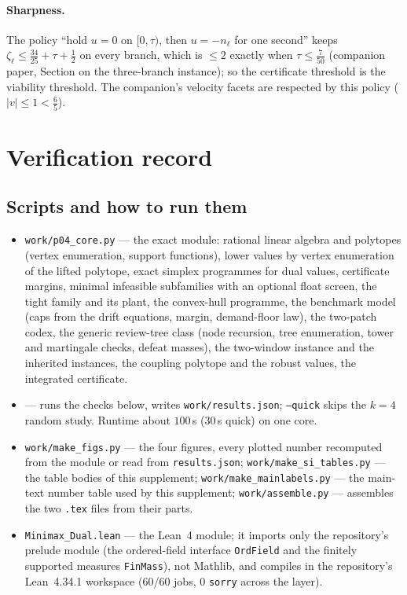 \documentclass[11pt,a4paper]{article}
\theoremstyle{plain}
\theoremstyle{definition}
\theoremstyle{remark}
\newcommand{\tfr}[2]{\tfrac{#1}{#2}}
\begin{document}
\paragraph{Sharpness.} The policy ``hold $u=0$ on $[0,\tau)$, then $u=-n_\ell$ for one second'' keeps $\zeta_\ell\le\tfr{34}{25}+\tau+\tfr12$ on every branch, which is $\le2$ exactly when $\tau\le\tfr7{50}$ (companion paper, Section on the three-branch instance); so the certificate threshold is the viability threshold. The companion's velocity facets are respected by this policy ($|v|\le1<\tfr65$).
\section{Verification record}\label{si:verification}

\subsection{Scripts and how to run them}
\begin{itemize}[leftmargin=1.4em,itemsep=1pt]
\item \texttt{work/p04\_core.py} --- the exact module: rational linear algebra and polytopes (vertex enumeration, support functions), lower values by vertex enumeration of the lifted polytope, exact simplex programmes for dual values, certificate margins, minimal infeasible subfamilies with an optional float screen, the tight family and its plant, the convex-hull programme, the benchmark model (caps from the drift equations, margin, demand-floor law), the two-patch codex, the generic review-tree class (node recursion, tree enumeration, tower and martingale checks, defeat masses), the two-window instance and the inherited instances, the coupling polytope and the robust values, the integrated certificate.
\item {} --- runs the checks below, writes \texttt{work/results.json}; \texttt{--quick} skips the $k=4$ random study. Runtime about $100$\,s ($30$\,s quick) on one core.
\item \texttt{work/make\_figs.py} --- the four figures, every plotted number recomputed from the module or read from \texttt{results.json}; \texttt{work/make\_si\_tables.py} --- the table bodies of this supplement; \texttt{work/make\_mainlabels.py} --- the main-text number table used by this supplement; \texttt{work/assemble.py} --- assembles the two \texttt{.tex} files from their parts.
\item \texttt{Minimax\_Dual.lean} --- the Lean~4 module; it imports only the repository's prelude module (the ordered-field interface \texttt{OrdField} and the finitely supported measures \texttt{FinMass}), not Mathlib, and compiles in the repository's Lean~4.34.1 workspace (60/60 jobs, 0 \texttt{sorry} across the layer).
\end{itemize}
\end{document}
